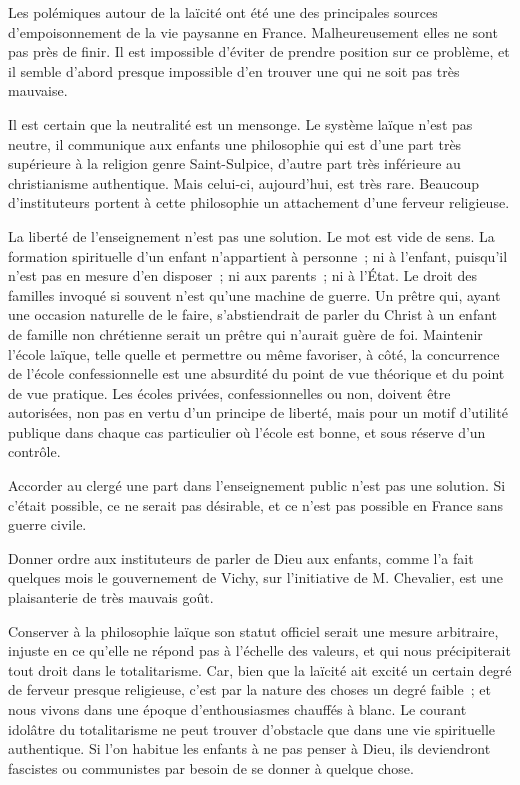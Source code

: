 \documentclass[french,twoside]{book} %
\begin{document}
Les polémiques autour de la laïcité ont été une des principales sources d'empoisonnement de la vie paysanne en France. Malheureusement elles ne sont pas près de finir. Il est impossible d'éviter de prendre position sur ce problème, et il semble d'abord presque impossible d'en trouver une qui ne soit pas très mauvaise.\par
Il est certain que la neutralité est un mensonge. Le système laïque n'est pas neutre, il communique aux enfants une philosophie qui est d'une part très supérieure à la religion genre Saint-Sulpice, d'autre part très inférieure au christianisme authentique. Mais celui-ci, aujourd'hui, est très rare. Beaucoup d'instituteurs portent à cette philosophie un attachement d'une ferveur religieuse.\par
La liberté de l'enseignement n'est pas une solution. Le mot est vide de sens. La formation spirituelle d'un enfant n'appartient à personne ; ni à l'enfant, puisqu'il n'est pas en mesure d'en disposer ; ni aux parents ; ni à l'État. Le droit des familles invoqué si souvent n'est qu'une machine de guerre. Un prêtre qui, ayant une occasion naturelle de le faire, s'abstiendrait de parler du Christ à un enfant de famille non chrétienne serait un prêtre qui n'aurait guère de foi. Maintenir l'école laïque, telle quelle et permettre ou même favoriser, à côté, la concurrence de l'école confessionnelle est une absurdité du point de vue théorique et du point de vue pratique. Les écoles privées, confessionnelles ou non, doivent être autorisées, non pas en vertu d'un principe de liberté, mais pour un motif d'utilité publique dans chaque cas particulier où l'école est bonne, et sous réserve d'un contrôle.\par
Accorder au clergé une part dans l'enseignement public n'est pas une solution. Si c'était possible, ce ne serait pas désirable, et ce n'est pas possible en France sans guerre civile.\par
Donner ordre aux instituteurs de parler de Dieu aux enfants, comme l'a fait quelques mois le gouvernement de Vichy, sur l'initiative de M. Chevalier, est une plaisanterie de très mauvais goût.\par
Conserver à la philosophie laïque son statut officiel serait une mesure arbitraire, injuste en ce qu'elle ne répond pas à l'échelle des valeurs, et qui nous précipiterait tout droit dans le totalitarisme. Car, bien que la laïcité ait excité un certain degré de ferveur presque religieuse, c'est par la nature des choses un degré faible ; et nous vivons dans une époque d'enthousiasmes chauffés à blanc. Le courant idolâtre du totalitarisme ne peut trouver d'obstacle que dans une vie spirituelle authentique. Si l'on habitue les enfants à ne pas penser à Dieu, ils deviendront fascistes ou communistes par besoin de se donner à quelque chose.\par
\end{document}
